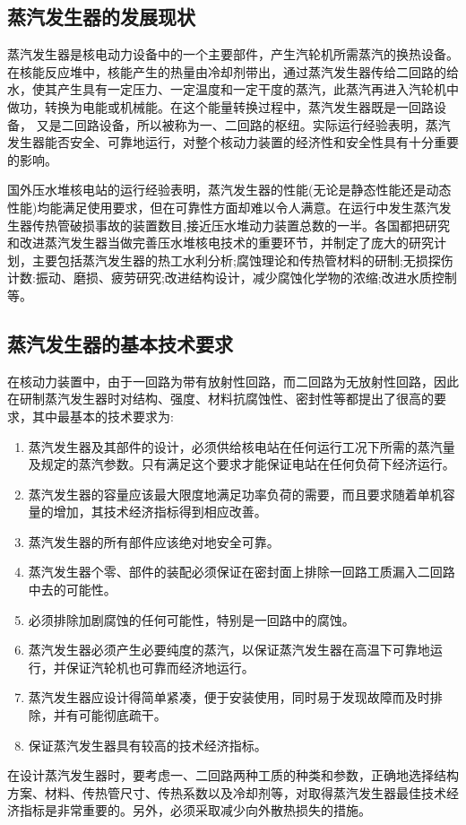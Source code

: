 \subsection{蒸汽发生器的发展现状}
蒸汽发生器是核电动力设备中的一个主要部件，产生汽轮机所需蒸汽的换热设备\cite{2009船舶核动力装置}。在核能反应堆中，核能产生的热量由冷却剂带出，通过蒸汽发生器传给二回路的给水，使其产生具有一定压力、一定温度和一定干度的蒸汽，此蒸汽再进入汽轮机中做功，转换为电能或机械能。在这个能量转换过程中，蒸汽发生器既是一回路设备， 又是二回路设备，所以被称为一、二回路的枢纽。实际运行经验表明，蒸汽发生器能否安全、可靠地运行，对整个核动力装置的经济性和安全性具有十分重要的影响。
\par
国外压水堆核电站的运行经验表明，蒸汽发生器的性能(无论是静态性能还是动态性能)均能满足使用要求，但在可靠性方面却难以令人满意。在运行中发生蒸汽发生器传热管破损事故的装置数目,接近压水堆动力装置总数的一半。各国都把研究和改进蒸汽发生器当做完善压水堆核电技术的重要环节，并制定了庞大的研究计划，主要包括蒸汽发生器的热工水利分析;腐蚀理论和传热管材料的研制;无损探伤计数:振动、磨损、疲劳研究;改进结构设计，减少腐蚀化学物的浓缩;改进水质控制等。

\subsection{蒸汽发生器的基本技术要求}
在核动力装置中，由于一回路为带有放射性回路，而二回路为无放射性回路，因此在研制蒸汽发生器时对结构、强度、材料抗腐蚀性、密封性等都提出了很高的要求，其中最基本的技术要求为:
\begin{enumerate}
    \item 蒸汽发生器及其部件的设计，必须供给核电站在任何运行工况下所需的蒸汽量及规定的蒸汽参数。只有满足这个要求才能保证电站在任何负荷下经济运行。
    \item 蒸汽发生器的容量应该最大限度地满足功率负荷的需要，而且要求随着单机容量的增加，其技术经济指标得到相应改善。
    \item 蒸汽发生器的所有部件应该绝对地安全可靠。
    \item 蒸汽发生器个零、部件的装配必须保证在密封面上排除一回路工质漏入二回路中去的可能性。
    \item 必须排除加剧腐蚀的任何可能性，特别是一回路中的腐蚀。
    \item 蒸汽发生器必须产生必要纯度的蒸汽，以保证蒸汽发生器在高温下可靠地运行，并保证汽轮机也可靠而经济地运行。
    \item 蒸汽发生器应设计得简单紧凑，便于安装使用，同时易于发现故障而及时排除，并有可能彻底疏干。
    \item 保证蒸汽发生器具有较高的技术经济指标。
\end{enumerate}
\par
在设计蒸汽发生器时，要考虑一、二回路两种工质的种类和参数，正确地选择结构方案、材料、传热管尺寸、传热系数以及冷却剂等，对取得蒸汽发生器最佳技术经济指标是非常重要的。另外，必须采取减少向外散热损失的措施。

